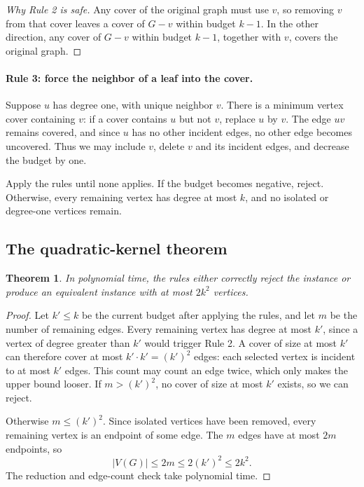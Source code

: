 \documentclass[11pt]{article}
\newtheorem{theorem}{Theorem}[section]
\begin{document}
\begin{proof}[Why Rule 2 is safe]
Any cover of the original graph must use $v$, so removing $v$ from that cover leaves a cover of $G-v$ within budget $k-1$. In the other direction, any cover of $G-v$ within budget $k-1$, together with $v$, covers the original graph.
\end{proof}

\paragraph{Rule 3: force the neighbor of a leaf into the cover.} Suppose $u$ has degree one, with unique neighbor $v$. There is a minimum vertex cover containing $v$: if a cover contains $u$ but not $v$, replace $u$ by $v$. The edge $uv$ remains covered, and since $u$ has no other incident edges, no other edge becomes uncovered. Thus we may include $v$, delete $v$ and its incident edges, and decrease the budget by one.

Apply the rules until none applies. If the budget becomes negative, reject. Otherwise, every remaining vertex has degree at most $k$, and no isolated or degree-one vertices remain.

\subsection{The quadratic-kernel theorem}

\begin{theorem}
In polynomial time, the rules either correctly reject the instance or produce an equivalent instance with at most $2k^2$ vertices.
\end{theorem}
\begin{proof}
Let $k'\leq k$ be the current budget after applying the rules, and let $m$ be the number of remaining edges. Every remaining vertex has degree at most $k'$, since a vertex of degree greater than $k'$ would trigger Rule 2. A cover of size at most $k'$ can therefore cover at most $k'\cdot k'=(k')^2$ edges: each selected vertex is incident to at most $k'$ edges. This count may count an edge twice, which only makes the upper bound looser. If $m>(k')^2$, no cover of size at most $k'$ exists, so we can reject.

Otherwise $m\leq (k')^2$. Since isolated vertices have been removed, every remaining vertex is an endpoint of some edge. The $m$ edges have at most $2m$ endpoints, so
\[
|V(G)|\leq 2m\leq 2(k')^2\leq 2k^2.
\]
The reduction and edge-count check take polynomial time.
\end{proof}
\end{document}

